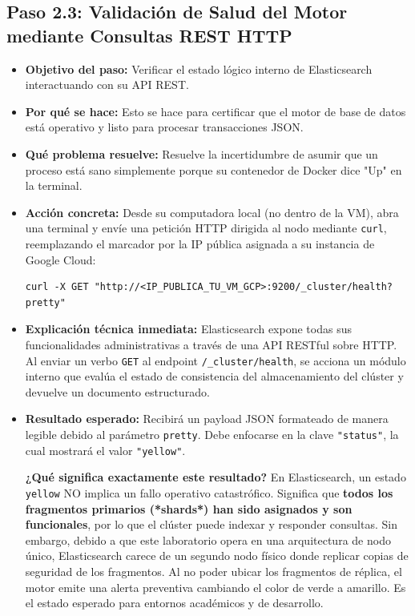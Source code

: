 \documentclass[
  coursetitle={Cómputo Nube y Tecnologías Emergentes},
  coursehours={96},
  coursedate={Verano 2026},
  doctype={Práctica},
  otherlangs={english,french},
  authorname={Lázaro},
  authorsurname={Bustio-Martínez},
  authortitle={PhD},
  role={Profesor Investigador},
  email={lbustio@inaoe.mx},
  phone={5559504000},
  ext={7459},
  institution={Instituto Nacional de Astrofísica, Óptica y Electrónica (INAOE)},
  department={Maestría en Ciencias en Tecnologías de Seguridad},
  address={Luis Enrique Erro 1, Sta. Ma. Tonantzintla, San Andrés Cholula, CP 72840, Puebla, México},
  margin={0.5in}
]{../../lbustio_lecture_notes}
\begin{document}
\subsection{Paso 2.3: Validación de Salud del Motor mediante Consultas REST HTTP}

\begin{itemize}
    \item \textbf{Objetivo del paso:} Verificar el estado lógico interno de Elasticsearch interactuando con su API REST.
    \item \textbf{Por qué se hace:} Esto se hace para certificar que el motor de base de datos está operativo y listo para procesar transacciones JSON.
    \item \textbf{Qué problema resuelve:} Resuelve la incertidumbre de asumir que un proceso está sano simplemente porque su contenedor de Docker dice "Up" en la terminal.
    \item \textbf{Acción concreta:} Desde su computadora local (no dentro de la VM), abra una terminal y envíe una petición HTTP dirigida al nodo mediante \texttt{curl}, reemplazando el marcador por la IP pública asignada a su instancia de Google Cloud:
    
\begin{verbatim}
curl -X GET "http://<IP_PUBLICA_TU_VM_GCP>:9200/_cluster/health?pretty"
\end{verbatim}

    \item \textbf{Explicación técnica inmediata:} Elasticsearch expone todas sus funcionalidades administrativas a través de una API RESTful sobre HTTP. Al enviar un verbo \texttt{GET} al endpoint \texttt{/\_cluster/health}, se acciona un módulo interno que evalúa el estado de consistencia del almacenamiento del clúster y devuelve un documento estructurado.
    
    \item \textbf{Resultado esperado:} Recibirá un payload JSON formateado de manera legible debido al parámetro \texttt{pretty}. Debe enfocarse en la clave \texttt{"status"}, la cual mostrará el valor \texttt{"yellow"}.
    
    \begin{tcolorbox}[title=Interpretación Pedagógica del Estado "Yellow"]
    \textbf{¿Qué significa exactamente este resultado?} En Elasticsearch, un estado \texttt{yellow} NO implica un fallo operativo catastrófico. Significa que \textbf{todos los fragmentos primarios (*shards*) han sido asignados y son funcionales}, por lo que el clúster puede indexar y responder consultas. Sin embargo, debido a que este laboratorio opera en una arquitectura de nodo único, Elasticsearch carece de un segundo nodo físico donde replicar copias de seguridad de los fragmentos. Al no poder ubicar los fragmentos de réplica, el motor emite una alerta preventiva cambiando el color de verde a amarillo. Es el estado esperado para entornos académicos y de desarrollo.
    \end{tcolorbox}
    

\end{itemize}
\end{document}
